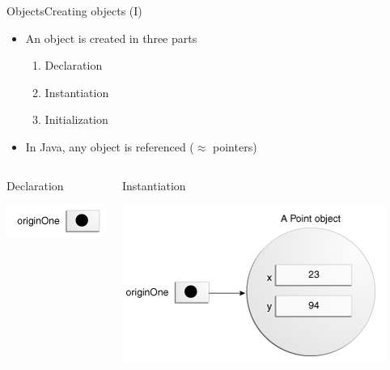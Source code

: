 \documentclass[10pt,compress]{beamer} %
\begin{document}
\begin{frame}{Objects}{Creating objects (I)}
	\vspace{-0.4cm}
	\begin{itemize}
	\item An object is created in three parts
		\begin{enumerate}
		\item Declaration
		\item Instantiation
		\item Initialization
		\end{enumerate}
	\item In Java, any object is \alert{referenced} ($\approx$ pointers)
	\end{itemize}

    \begin{columns}
	\vspace{-0.2cm}
	\begin{block}{Declaration}
	\vspace{-0.2cm}
		
		\vspace{-0.2cm}
		\centering \includegraphics[width=0.7\linewidth]{figs/objects-null.png}
	\end{block}

	\vspace{-0.2cm}
	\begin{block}{Instantiation}
	\vspace{-0.2cm}
		
		\vspace{-0.2cm}
		\centering \includegraphics[width=0.6\linewidth]{figs/objects-oneRef.png}
	\end{block}
	\end{columns}
\end{frame}
\end{document}
